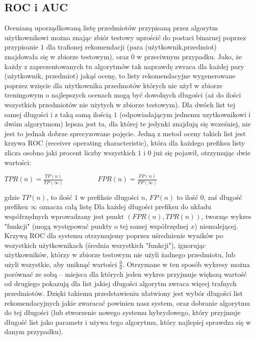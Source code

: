 \documentclass{pracamgr}
\begin{document}
   \subsection{ROC i AUC}
    Ocenianą uporządkowaną listę przedmiotów przypisaną przez algorytm użytkownikowi można znając zbiór testowy uprościć do postaci binarnej
    poprzez przypisanie $1$ dla trafionej rekomendacji (para (użytkownik,przedmiot) znajdowała się w zbiorze testowym), oraz $0$ w przeciwnym przypadku.
    Jako, że każdy z zaprezentowanych tu algorytmów tak naprawdę zwraca dla każdej pary (użytkownik, przedmiot) jakąś ocenę,
    to listy rekomendacyjne wygenerowane poprzez wzięcie dla użytkownika przedmotów których nie użył w zbiorze treningowym o najlepszych ocenach
    mogą być dowolnych długości (aż do ilości wszystkich przedmiotów nie użytych w zbiorze testowym).
    Dla dwóch list tej samej długości i z taką samą ilością $1$ (odpowiadającym jednemu uzytkownikowi i dwóm algorytmom) lepsza jest ta,
    dla której te jedynki znajdują się wcześniej, nie jest to jednak dobrze sprecyzowane pojęcie.
    Jedną z metod oceny takich list jest krzywa ROC (receiver operating characteristic), która dla każdego prefiksu listy zlicza osobno
    jaki procent liczby wszystkich $1$ i $0$ już się pojawił, otrzymując dwie wartości:
    \begin{center}
     $TPR(n)=\frac{TP(n)}{TP(\infty)}\quad\quad\quad\quad\quad
     FPR(n)=\frac{FP(n)}{FP(\infty)}$
    \end{center}
    {\scriptsize
     gdzie $TP(n)$, to ilość $1$ w prefiksie długości $n$, $FP(n)$ to ilość $0$, zaś długość prefiksu $\infty$ oznacza całą listę
    }\newline
    Dla każdej długości prefiksu do układu współrzędnych wprowadzany jest punkt $(FPR(n),TPR(n))$, tworząc wykres "funkcji"
    (mogą występować punkty o tej samej współrzędnej $x$) niemalejącej. Krzywą ROC dla systemu otrzymujemy poprzez uśrednienie wyników
    po wszystkich użytkownikach (średnia wszystkich "funkcji"), ignorując użytkowników, którzy w zbiorze testowym nie użyli żadnego przedmiotu,
    lub użyli wszystkie, aby uniknąć wartości $\frac{0}{0}$.
    Otrzymane w ten sposób wykresy można porównać ze sobą -- miejsca dla których jeden wykres przyjmuje większą wartość od drugiego pokazują
    dla list jakiej długości algorytm zwraca więcej trafnych przedmiotów. Dzięki takiemu przedstawieniu ułatwiony jest wybór długości list rekomendacyjnych
    jakie zwaracać powinien nasz system, oraz dobranie algorytmu do tej długości
    (lub stworzenie nowego systemu hybrydowego, który przyjmuje długość list jako parametr i używa tego algorytmu, który najlepiej sprawdza się w danym przypadku).
\end{document}
